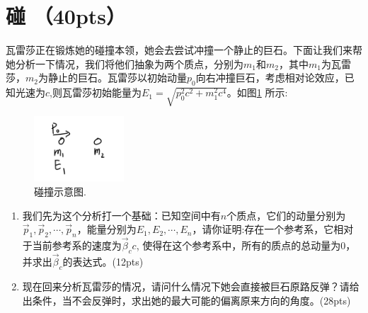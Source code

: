 \section{碰 （40pts）}
瓦雷莎正在锻炼她的碰撞本领，她会去尝试冲撞一个静止的巨石。下面让我们来帮她分析一下情况，我们将他们抽象为两个质点，分别为\(m_1\)和\(m_2\)，其中\(m_1\)为瓦雷莎，\(m_2\)为静止的巨石。瓦雷莎以初始动量\(p_0\)向右冲撞巨石，考虑相对论效应，已知光速为\(c\),则瓦雷莎初始能量为\(E_1 = \sqrt{p_0^2c^2 + m_1^2c^4}\)。如图\ref{peng1} 所示:
\begin{figure}[htbp]
	\centering
	\includegraphics[width=0.3\textwidth]{peng1}
	\caption{碰撞示意图.}
	\label{peng1}
\end{figure}
\begin{enumerate}
	\item 我们先为这个分析打一个基础：已知空间中有\(n\)个质点，它们的动量分别为\(\vec{p}_1,\vec{p}_2,\cdots,\vec{p}_n\)，能量分别为\(E_1,E_2,\cdots,E_n\)，请你证明:存在一个参考系，它相对于当前参考系的速度为\(\vec{\beta}_c c\), 使得在这个参考系中，所有的质点的总动量为0，并求出\(\vec{\beta}_c\)的表达式。(12pts)
	\item 现在回来分析瓦雷莎的情况，请问什么情况下她会直接被巨石原路反弹？请给出条件，当不会反弹时，求出她的最大可能的偏离原来方向的角度。(28pts)
\end{enumerate}

